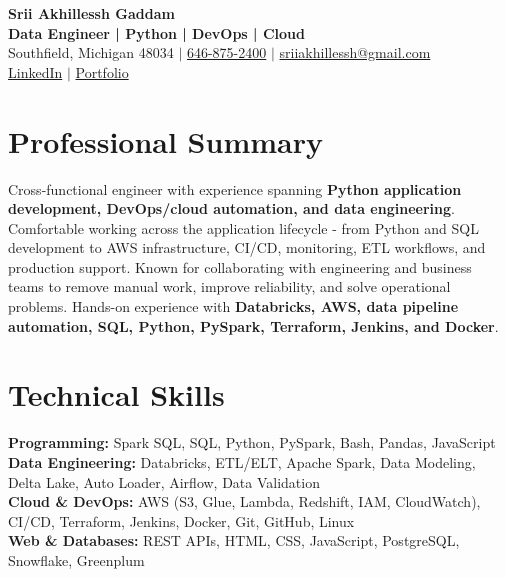 \documentclass[letterpaper,10pt]{article}
\begin{document}
\fontsize{9.35pt}{10.45pt}\selectfont

\begin{center}
    {\LARGE \textbf{Srii Akhillessh Gaddam}} \\[-1pt]
    \textbf{Data Engineer | Python | DevOps | Cloud} \\[2pt]
    Southfield, Michigan 48034 $|$
    \href{tel:6468752400}{646-875-2400} $|$
    \href{mailto:sriiakhillessh@gmail.com}{sriiakhillessh@gmail.com} \\[1pt]
    \href{https://www.linkedin.com/in/srii-akhiilessh-gaddam-b48668191/}{LinkedIn} $|$
    \href{https://sriiakhillesshg.github.io/portfolio/}{Portfolio}
\end{center}
\vspace{-8pt}

\section{Professional Summary}
\small{Cross-functional engineer with experience spanning \textbf{Python application development, DevOps/cloud automation, and data engineering}. Comfortable working across the application lifecycle - from Python and SQL development to AWS infrastructure, CI/CD, monitoring, ETL workflows, and production support. Known for collaborating with engineering and business teams to remove manual work, improve reliability, and solve operational problems. Hands-on experience with \textbf{Databricks, AWS, data pipeline automation, SQL, Python, PySpark, Terraform, Jenkins, and Docker}.}

\section{Technical Skills}
\small{
\textbf{Programming:} Spark SQL, SQL, Python, PySpark, Bash, Pandas, JavaScript \\
\textbf{Data Engineering:} Databricks, ETL/ELT, Apache Spark, Data Modeling, Delta Lake, Auto Loader, Airflow, Data Validation \\
\textbf{Cloud \& DevOps:} AWS (S3, Glue, Lambda, Redshift, IAM, CloudWatch), CI/CD, Terraform, Jenkins, Docker, Git, GitHub, Linux \\
\textbf{Web \& Databases:} REST APIs, HTML, CSS, JavaScript, PostgreSQL, Snowflake, Greenplum
}

\end{document}
